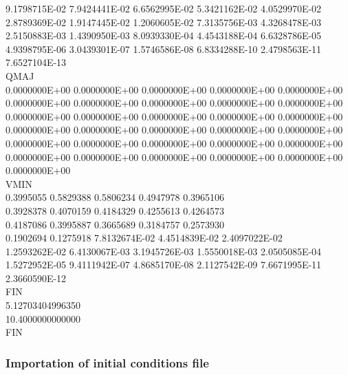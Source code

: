 \documentclass[a4paper,12pt]{article}
\begin{document}
  9.1798715E-02  7.9424441E-02  6.6562995E-02  5.3421162E-02  4.0529970E-02\\
  2.8789369E-02  1.9147445E-02  1.2060605E-02  7.3135756E-03  4.3268478E-03\\
  2.5150883E-03  1.4390950E-03  8.0939330E-04  4.4543188E-04  6.6328786E-05\\
  4.9398795E-06  3.0439301E-07  1.5746586E-08  6.8334288E-10  2.4798563E-11\\
  7.6527104E-13\\
 QMAJ\\
  0.0000000E+00  0.0000000E+00  0.0000000E+00  0.0000000E+00  0.0000000E+00\\
  0.0000000E+00  0.0000000E+00  0.0000000E+00  0.0000000E+00  0.0000000E+00\\
  0.0000000E+00  0.0000000E+00  0.0000000E+00  0.0000000E+00  0.0000000E+00\\
  0.0000000E+00  0.0000000E+00  0.0000000E+00  0.0000000E+00  0.0000000E+00\\
  0.0000000E+00  0.0000000E+00  0.0000000E+00  0.0000000E+00  0.0000000E+00\\
  0.0000000E+00  0.0000000E+00  0.0000000E+00  0.0000000E+00  0.0000000E+00\\
  0.0000000E+00\\
 VMIN\\
  0.3995055      0.5829388      0.5806234      0.4947978      0.3965106  \\  
  0.3928378      0.4070159      0.4184329      0.4255613      0.4264573   \\ 
  0.4187086      0.3995887      0.3665689      0.3184757      0.2573930    \\
  0.1902694      0.1275918      7.8132674E-02  4.4514839E-02  2.4097022E-02\\
  1.2593262E-02  6.4130067E-03  3.1945726E-03  1.5550018E-03  2.0505085E-04\\
  1.5272952E-05  9.4111942E-07  4.8685170E-08  2.1127542E-09  7.6671995E-11\\
  2.3660590E-12\\
 FIN\\
   5.12703404996350   \\  
   10.4000000000000     \\
 FIN\\



\subsubsection{Importation of initial conditions file} 
\end{document}
